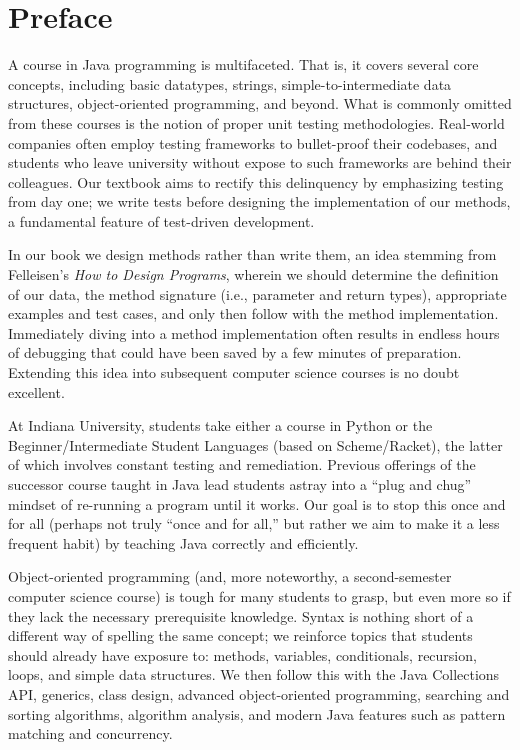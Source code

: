 \chapter*{Preface}

A course in Java programming is multifaceted. 
That is, it covers several core concepts, including basic datatypes, strings, simple-to-intermediate data structures, object-oriented programming, and beyond. 
What is commonly omitted from these courses is the notion of proper unit testing methodologies. 
Real-world companies often employ testing frameworks to bullet-proof their codebases, and students who leave university without expose to such frameworks are behind their colleagues. 
Our textbook aims to rectify this delinquency by emphasizing testing from day one; we write tests before designing the implementation of our methods, a fundamental feature of test-driven development.

In our book we design methods rather than write them, an idea stemming from Felleisen's \emph{How to Design Programs}, wherein we should determine the definition of our data, the method signature (i.e., parameter and return types), appropriate examples and test cases, and only then follow with the method implementation. 
Immediately diving into a method implementation often results in endless hours of debugging that could have been saved by a few minutes of preparation. 
Extending this idea into subsequent computer science courses is no doubt excellent.

At Indiana University, students take either a course in Python or the Beginner/Intermediate Student Languages (based on Scheme/Racket), the latter of which involves constant testing and remediation. 
Previous offerings of the successor course taught in Java lead students astray into a ``plug and chug'' mindset of re-running a program until it works.
Our goal is to stop this once and for all (perhaps not truly ``once and for all,'' but rather we aim to make it a less frequent habit) by teaching Java correctly and efficiently. 

Object-oriented programming (and, more noteworthy, a second-semester computer science course) is tough for many students to grasp, but even more so if they lack the necessary prerequisite knowledge. 
Syntax is nothing short of a different way of spelling the same concept; we reinforce topics that students should already have exposure to: methods, variables, conditionals, recursion, loops, and simple data structures. 
We then follow this with the Java Collections API, generics, class design, advanced object-oriented programming, searching and sorting algorithms, algorithm analysis, and modern Java features such as pattern matching and concurrency. 

